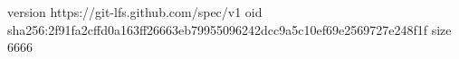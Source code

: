 version https://git-lfs.github.com/spec/v1
oid sha256:2f91fa2cffd0a163ff26663eb79955096242dcc9a5c10ef69e2569727e248f1f
size 6666
